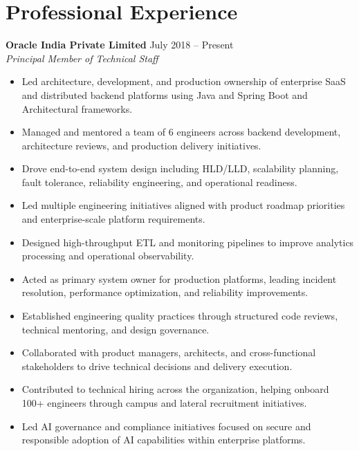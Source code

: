\documentclass[11pt,a4paper]{article}
\begin{document}
\section*{Professional Experience}

\textbf{Oracle India Private Limited} \hfill July 2018 -- Present \\
\textit{Principal Member of Technical Staff}

\begin{itemize}
    \item Led architecture, development, and production ownership of enterprise SaaS and distributed backend platforms using Java and Spring Boot and Architectural frameworks.
    
    \item Managed and mentored a team of 6 engineers across backend development, architecture reviews, and production delivery initiatives.
    
    \item Drove end-to-end system design including HLD/LLD, scalability planning, fault tolerance, reliability engineering, and operational readiness.
    
    \item Led multiple engineering initiatives aligned with product roadmap priorities and enterprise-scale platform requirements.
    
    \item Designed high-throughput ETL and monitoring pipelines to improve analytics processing and operational observability.
    
    \item Acted as primary system owner for production platforms, leading incident resolution, performance optimization, and reliability improvements.
    
    \item Established engineering quality practices through structured code reviews, technical mentoring, and design governance.
    
    \item Collaborated with product managers, architects, and cross-functional stakeholders to drive technical decisions and delivery execution.
    
    \item Contributed to technical hiring across the organization, helping onboard 100+ engineers through campus and lateral recruitment initiatives.
    
    \item Led AI governance and compliance initiatives focused on secure and responsible adoption of AI capabilities within enterprise platforms.
\end{itemize}
\end{document}
